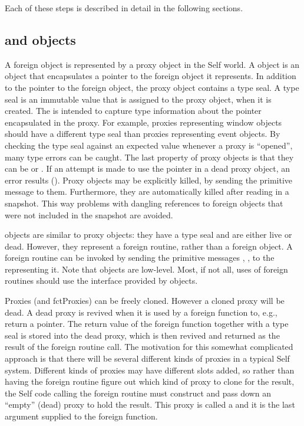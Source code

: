 \documentclass[letterpaper,10pt,english]{sphinxmanual}
\begin{document}
Each of these steps is described in detail in the following sections.


\subsection{ and  objects}
\label{\detokenize{vmref:proxy-and-fctproxy-objects}}\label{\detokenize{vmref:index-59}}
A foreign object is represented by a proxy object in the Self world. A  object is an object
that encapsulates a pointer to the foreign object it represents. In addition to the pointer to the foreign
object, the proxy object contains a type seal. A type seal is an immutable value that is assigned
to the proxy object, when it is created. The  is intended to capture type information about
the pointer encapsulated in the proxy. For example, proxies representing window objects should
have a different type seal than proxies representing event objects. By checking the type seal against
an expected value whenever a proxy is “opened”, many type errors can be caught. The last property
of proxy objects is that they can be  or . If an attempt is made to use the pointer in a dead
proxy object, an error results (). Proxy objects may be explicitly killed, by
sending the primitive message  to them. Furthermore, they are automatically killed after
reading in a snapshot. This way problems with dangling references to foreign objects that were not
included in the snapshot are avoided.

 objects are similar to proxy objects: they have a type seal and are either live or dead.
However, they represent a foreign routine, rather than a foreign object. A foreign routine can be invoked
by sending the primitive messages , ,
 to the  representing it. Note that  objects
are low-level. Most, if not all, uses of foreign routines should use the interface provided by 
objects.

Proxies (and fctProxies) can be freely cloned. However a cloned proxy will be dead. A dead
proxy is revived when it is used by a foreign function to, e.g., return a pointer. The return value of
the foreign function together with a type seal is stored into the dead proxy, which is then revived
and returned as the result of the foreign routine call. The motivation for this somewhat complicated
approach is that there will be several different kinds of proxies in a typical Self system. Different
kinds of proxies may have different slots added, so rather than having the foreign routine figure out
which kind of proxy to clone for the result, the Self code calling the foreign routine must construct
and pass down an “empty” (dead) proxy to hold the result. This proxy is called a 
and it is the last argument supplied to the foreign function.
\end{document}
